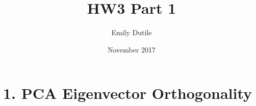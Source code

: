 \documentclass{neu_handout}
\title{HW3 Part 1}
\author{Emily Dutile}
\date{November 2017}
\begin{document}
\section*{1. PCA Eigenvector Orthogonality}
\end{document}
